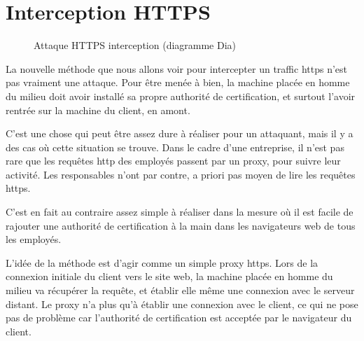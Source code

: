 \chapter{Interception HTTPS}

\label{sec:https-interception}

\begin{figure}[H]
  \caption{Attaque HTTPS interception (diagramme Dia)}
\end{figure}

La nouvelle méthode que nous allons voir pour intercepter un traffic https n'est pas vraiment une attaque. Pour être menée à bien, la machine placée en homme du milieu doit avoir installé sa propre authorité de certification, et surtout l'avoir rentrée sur la machine du client, en amont.

C'est une chose qui peut être assez dure à réaliser pour un attaquant, mais il y a des cas où cette situation se trouve. Dans le cadre d'une entreprise, il n'est pas rare que les requêtes http des employés passent par un proxy, pour suivre leur activité. Les responsables n'ont par contre, a priori pas moyen de lire les requêtes https. 

C'est en fait au contraire assez simple à réaliser dans la mesure où il est facile de rajouter une authorité de certification à la main dans les navigateurs web de tous les employés.

L'idée de la méthode est d'agir comme un simple proxy https. Lors de la connexion initiale du client vers le site web, la machine placée en homme du milieu va récupérer la requête, et établir elle même une connexion avec le serveur distant. Le proxy n'a plus qu'à établir une connexion avec le client, ce qui ne pose pas de problème car l'authorité de certification est acceptée par le navigateur du client.




